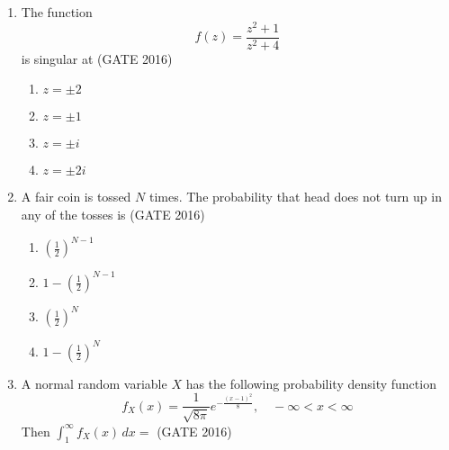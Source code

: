 \documentclass[journal,12pt,onecolumn]{IEEEtran}
\theoremstyle{remark}
\begin{document}
\begin{enumerate}
\begin{multicols}{4}
\begin{enumerate}
    \item $\dfrac{\partial f}{\partial x} = \dfrac{\partial g}{\partial y}$
    \item $\dfrac{\partial f}{\partial x} = -\dfrac{\partial g}{\partial y}$
    \item $\dfrac{\partial f}{\partial y} = -\dfrac{\partial g}{\partial x}$
    \item $\dfrac{\partial f}{\partial y} = \dfrac{\partial g}{\partial x}$
\end{enumerate}
\end{multicols}
\vspace{1cm}

\item The function 
\[
f(z) = \frac{z^2+1}{z^2+4}
\]
is singular at  
\hfill{(GATE 2016)}

\begin{multicols}{4}
\begin{enumerate}
    \item $z=\pm 2$
    \item $z=\pm 1$
    \item $z=\pm i$
    \item $z=\pm 2i$
\end{enumerate}
\end{multicols}
\vspace{1cm}
\newpage

\item A fair coin is tossed $N$ times. The probability that head does not turn up in any of the tosses is  
\hfill{(GATE 2016)}

\begin{multicols}{4}
\begin{enumerate}
    \item $\left(\tfrac{1}{2}\right)^{N-1}$
    \item $1 - \left(\tfrac{1}{2}\right)^{N-1}$
    \item $\left(\tfrac{1}{2}\right)^N$
    \item $1 - \left(\tfrac{1}{2}\right)^N$
\end{enumerate}
\end{multicols}
\vspace{1cm}
\item A normal random variable $X$ has the following probability density function
\[
f_X(x) = \frac{1}{\sqrt{8\pi}} e^{-\frac{(x-1)^2}{8}}, \quad -\infty < x < \infty
\]
Then $\int_{1}^{\infty} f_X(x)\,dx =$  
\hfill{(GATE 2016)}


\end{enumerate}
\end{document}
